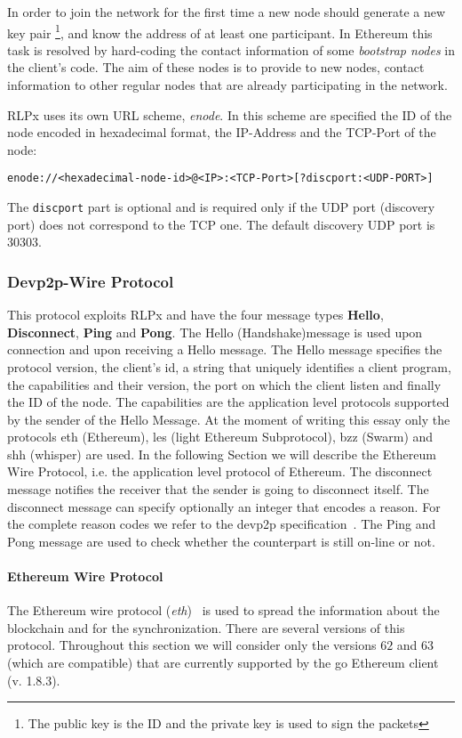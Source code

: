 In order to join the network for the first time a new node should
generate a new key pair
\footnote{The public key is the ID and the private key is used to sign the packets}, and
know the address of at least one participant.
In Ethereum this task is resolved by hard-coding the contact information
of some \textit{bootstrap nodes} in the client's code.
The aim of these nodes is to provide to new nodes, contact information to
other regular nodes that are already participating in the network.

RLPx uses its own URL scheme, \emph{enode}.
In this scheme are specified the ID of the node encoded in hexadecimal format,
the IP-Address and the TCP-Port of the node:
\begin{verbatim}
enode://<hexadecimal-node-id>@<IP>:<TCP-Port>[?discport:<UDP-PORT>]
\end{verbatim}
The \verb|discport| part is optional and is required only if the
UDP port (discovery port) does not correspond to the TCP one.
The default discovery UDP port is 30303.



\subsubsection{Devp2p-Wire Protocol}
\label{sec:devp2p-wire-protocol}
This protocol exploits RLPx and have the four message types
\textbf{Hello}, \textbf{Disconnect}, \textbf{Ping} and \textbf{Pong}.
The Hello (Handshake)message is used upon connection and upon receiving a
Hello message.
The Hello message specifies the protocol version, the client's id,
a string that uniquely identifies a client program, the capabilities and their
version, the port on which the client listen and finally the ID of the node.
The capabilities are the application level protocols supported by the sender
of the Hello Message. At the moment of writing this essay only the protocols
eth (Ethereum), les (light Ethereum Subprotocol), bzz (Swarm) and
shh (whisper) are used. In the following
Section we will describe the Ethereum Wire Protocol, i.e. the application
level protocol of Ethereum.
The disconnect message notifies the receiver that the sender is going to
disconnect itself. The disconnect message can specify optionally an
integer that encodes a reason.
For the complete reason codes we refer to the devp2p specification~\cite{}.
The Ping and Pong message are used to check whether the counterpart is still
on-line or not.

\paragraph{Ethereum Wire Protocol}
The Ethereum wire protocol
(\textit{eth})~\cite{bib:ethereumwireprotocol} is used to spread the information
about the blockchain and for the synchronization. There are several versions
of this protocol. Throughout this section we will consider only the versions
$62$ and $63$ (which are compatible) that are currently supported by the go
Ethereum client (v. 1.8.3).

